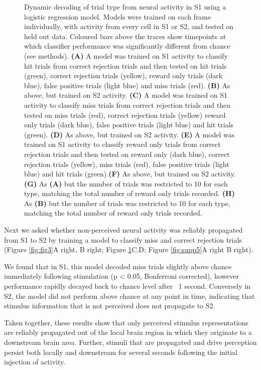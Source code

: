 \begin{figure}[h]
{Dynamic decoding of trial type from neural activity in S1 using a logistic regression model. Models were trained on each frame individually, with activity from every cell in S1 or S2, and tested on held out data. Coloured bars above the traces show timepoints at which classifier performance was significantly different from chance (see methods). \textbf{(A)} A model was trained on S1 activity to classify hit trials from correct rejection trials and then tested on hit trials (green), correct rejection trials (yellow), reward only trials (dark blue), false positive trials (light blue) and miss trials (red). \textbf{(B)} As above, but trained on S2 activity. \textbf{(C)} A model was trained on S1 activity to classify miss trials from correct rejection trials and then tested on miss trials (red), correct rejection trials (yellow) reward only trials (dark blue), false positive trials (light blue) and hit trials (green). \textbf{(D)} As above, but trained on S2 activity. \textbf{(E)} A model was trained on S1 activity to classify reward only trials from correct rejection trials and then tested on reward only (dark blue), correct rejection trials (yellow), miss trials (red), false positive trials (light blue) and hit trials (green).\textbf{(F)} As above, but trained on S2 activity. \textbf{(G)} As \textbf{(A)} but the number of trials was restricted to 10 for each type, matching the total number of reward only trials recorded. \textbf{(H)} As \textbf{(B)} but the number of trials was restricted to 10 for each type, matching the total number of reward only trials recorded.
} 
\label{fig:supp4}
\end{figure}

Next we asked whether non-perceived neural activity was reliably propagated from S1 to S2 by training a model to classify miss and correct rejection trials (Figure \ref{fig:fig3}A right, B right; Figure \ref{fig:supp4}C,D; Figure \ref{fig:supp5}A right B right).

We found that in S1, this model decoded miss trials slightly above chance immediately following stimulation (p < 0.05, Bonferroni corrected), however performance rapidly decayed back to chance level after ~1 second. Conversely in S2, the model did not perform above chance at any point in time, indicating that stimulus information that is not perceived does not propagate to S2.

Taken together, these results show that only perceived stimulus representations are reliably propagated out of the local brain region in which they originate to a downstream brain area. Further, stimuli that are propagated and drive perception persist both locally and downstream for several seconds following the initial injection of activity.

